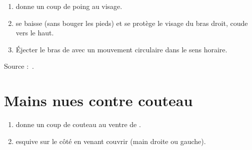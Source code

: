 \begin{exercice}
\label{mains-nues:ex:enzi-4}

\begin{enumerate}
	\item \A donne un coup de poing au visage.
	\item \D se baisse (sans bouger les pieds) et se protège le visage du bras droit, coude vers le haut.
	\item Éjecter le bras de \A avec un mouvement circulaire dans le sens horaire.
\end{enumerate}

Source :~\cite{enzi:dijon:messer_inner:2015}.

\end{exercice}


\section{Mains nues contre couteau}


\begin{exercice}

\begin{enumerate}
	\item \A donne un coup de couteau au ventre de \D.
	
	\item \D esquive sur le côté en venant couvrir (main droite ou gauche).
\end{enumerate}

\end{exercice}



